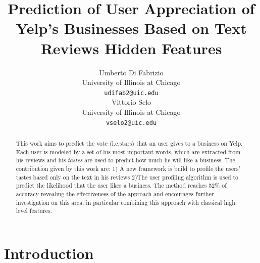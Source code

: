 \documentclass[11pt]{article}
\title{Prediction of User Appreciation of Yelp's Businesses Based on Text Reviews Hidden Features}
\author{Umberto Di Fabrizio \\
	University of Illinois at Chicago\\
	{\tt udifab2@uic.edu} \\\And
	Vittorio Selo \\
	University of Illinois at Chicago\\
	{\tt vselo2@uic.edu} \\}
\date{}
\begin{document}
\maketitle
\begin{abstract}
	This work aims to predict the vote (i.e.stars) that an user gives to a business on Yelp. Each user is modeled by a set of his most important words, which are extracted from his reviews and his \textit{tastes} are used to predict how much he will like a business. The contribution given by this work are: 1) A new framework is build to profile the users' tastes based only on the text in his reviews 2)The user profiling algorithm is used to predict the likelihood that the user likes a business. The method reaches 52\% of accuracy revealing the effectiveness of the approach and encourages further investigation on this area, in particular combining this approach with classical high level features.
\end{abstract}

\section{Introduction}
\end{document}

